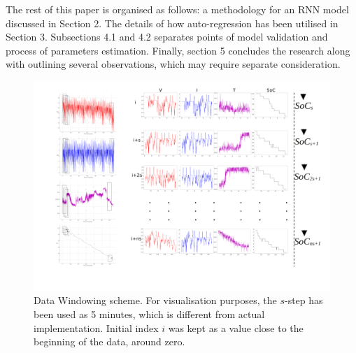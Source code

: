 %
%
The rest of this paper is organised as follows: a methodology for an RNN model discussed in Section 2.
The details of how auto-regression has been utilised in Section 3.
Subsections 4.1 and 4.2 separates points of model validation and process of parameters estimation.
Finally, section 5 concludes the research along with outlining several observations, which may require separate consideration.
\begin{landscape}
    \begin{figure}[ht]
        \centering
        \includegraphics[width=0.9\linewidth]{II_Body/images/Windowing4f-A3.jpg}
        \caption{Data Windowing scheme. For visualisation purposes, the $s$-step has been used as 5 minutes, which is different from actual implementation. Initial index $i$ was kept as a value close to the beginning of the data, around zero.}
        \label{fig:Windowing}
    \end{figure}
\end{landscape}